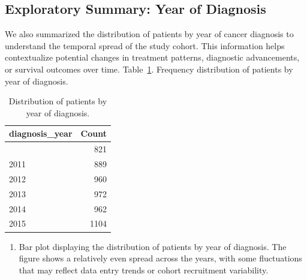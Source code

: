 \documentclass[
  letterpaper,
  DIV=11,
  numbers=noendperiod]{scrartcl}
\providecommand{\tightlist}{%
  \setlength{\itemsep}{0pt}\setlength{\parskip}{0pt}}\usepackage{longtable,booktabs,array}
\begin{document}
\subsection{Exploratory Summary: Year of
Diagnosis}\label{exploratory-summary-year-of-diagnosis}

We also summarized the distribution of patients by year of cancer
diagnosis to understand the temporal spread of the study cohort. This
information helps contextualize potential changes in treatment patterns,
diagnostic advancements, or survival outcomes over time.
Table~\ref{tbl-year-summary}. Frequency distribution of patients by year
of diagnosis.

\begin{longtable}[]{@{}lr@{}}

\caption{\label{tbl-year-summary}Distribution of patients by year of
diagnosis.}

\tabularnewline

\toprule\noalign{}
diagnosis\_year & Count \\
\midrule\noalign{}
\endhead
\bottomrule\noalign{}
\endlastfoot
2010 & 821 \\
2011 & 889 \\
2012 & 960 \\
2013 & 972 \\
2014 & 962 \\
2015 & 1104 \\

\end{longtable}

\begin{enumerate}
\def\labelenumi{\arabic{enumi}.}
\tightlist
\item
  Bar plot displaying the distribution of patients by year of diagnosis.
  The figure shows a relatively even spread across the years, with some
  fluctuations that may reflect data entry trends or cohort recruitment
  variability.
\end{enumerate}
\end{document}
